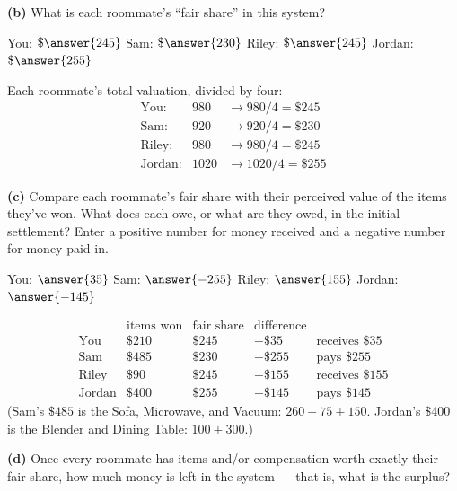 \documentclass[12pt]{ximera}
\begin{document}
\begin{problem}
\begin{prompt}
\textbf{(b)} What is each roommate's ``fair share'' in this system?

You: $\$\answer{245}$ \quad Sam: $\$\answer{230}$ \quad Riley: $\$\answer{245}$ \quad
Jordan: $\$\answer{255}$

\begin{feedback}
Each roommate's total valuation, divided by four:
\[
\begin{array}{lll}
\text{You}: & 980 & \to 980/4 = \$245\\
\text{Sam}: & 920 & \to 920/4 = \$230\\
\text{Riley}: & 980 & \to 980/4 = \$245\\
\text{Jordan}: & 1020 & \to 1020/4 = \$255
\end{array}
\]
\end{feedback}
\end{prompt}

\begin{prompt}
\textbf{(c)} Compare each roommate's fair share with their perceived value of the items
they've won. What does each owe, or what are they owed, in the initial settlement?
Enter a positive number for money received and a negative number for money paid in.

You: $\answer{35}$ \quad Sam: $\answer{-255}$ \quad Riley: $\answer{155}$ \quad
Jordan: $\answer{-145}$

\begin{feedback}
\[
\begin{array}{lcccl}
 & \text{items won} & \text{fair share} & \text{difference} & \\
\text{You} & \$210 & \$245 & -\$35 & \text{receives } \$35\\
\text{Sam} & \$485 & \$230 & +\$255 & \text{pays } \$255\\
\text{Riley} & \$90 & \$245 & -\$155 & \text{receives } \$155\\
\text{Jordan} & \$400 & \$255 & +\$145 & \text{pays } \$145
\end{array}
\]
(Sam's $\$485$ is the Sofa, Microwave, and Vacuum: $260+75+150$. Jordan's $\$400$ is
the Blender and Dining Table: $100+300$.)
\end{feedback}
\end{prompt}

\begin{prompt}
\textbf{(d)} Once every roommate has items and/or compensation worth exactly their fair
share, how much money is left in the system --- that is, what is the surplus?


\end{prompt}
\end{problem}
\end{document}
